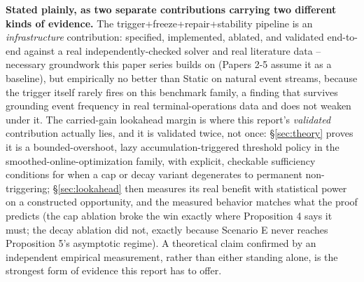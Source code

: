 \documentclass[11pt]{article}
\begin{document}
\textbf{Stated plainly, as two separate contributions carrying two
different kinds of evidence.} The trigger+freeze+repair+stability
pipeline is an \emph{infrastructure} contribution: specified, implemented,
ablated, and validated end-to-end against a real independently-checked
solver and real literature data -- necessary groundwork this paper series
builds on (Papers 2-5 assume it as a baseline), but empirically no better
than Static on natural event streams, because the trigger itself rarely
fires on this benchmark family, a finding that survives grounding event
frequency in real terminal-operations data and does not weaken under it.
The carried-gain lookahead margin is where this report's \emph{validated}
contribution actually lies, and it is validated twice, not once:
\S\ref{sec:theory} proves it is a bounded-overshoot, lazy
accumulation-triggered threshold policy in the smoothed-online-optimization
family, with explicit, checkable sufficiency conditions for when a cap or
decay variant degenerates to permanent non-triggering; \S\ref{sec:lookahead}
then measures its real benefit with statistical power on a constructed
opportunity, and the measured behavior matches what the proof predicts
(the cap ablation broke the win exactly where Proposition 4 says it must;
the decay ablation did not, exactly because Scenario E never reaches
Proposition 5's asymptotic regime). A theoretical claim confirmed by an
independent empirical measurement, rather than either standing alone, is
the strongest form of evidence this report has to offer.
\end{document}
